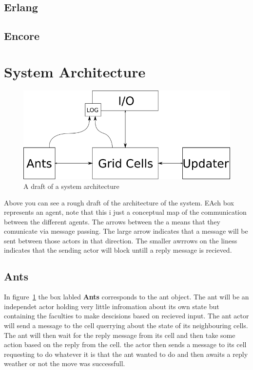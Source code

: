 \documentclass[a4paper]{article}
\begin{document}
\subsection{Erlang}

\subsection{Encore}

\section{System Architecture}

\begin{figure}[h!]
\centerline{
\includegraphics[scale=0.6]{images/architecture.png} 
}
\caption{A draft of a system architecture} 
\label{fig:arch}
\end{figure}
Above you can see a rough draft of the architecture of the system. EAch box
represents an agent, note that this i just a conceptual map of the
communication between the different agents. The arrows between the a means that
they comunicate via message passing.
The large arrow indicates that a message will be sent between those actors in that
direction. The smaller awrrows on the liness indicates that the sending actor
will block untill a reply message is recieved.

\subsection{Ants}
In figure~\ref{fig:arch} the box labled \textbf{Ants} corresponds to the ant
object.
The ant will be an independet actor holding very little infromation about its
own state but containing the faculties to make descisions based on recieved
input. The ant actor will send a message to the cell querrying about the state
of its neighbouring cells. The ant will then wait for the reply message from its
cell and then take some action based on the reply from the cell. the actor then
sends a message to its cell requesting to do whatever it is that the ant wanted
to do and then awaits a reply weather or not the move was successfull.
\end{document}
